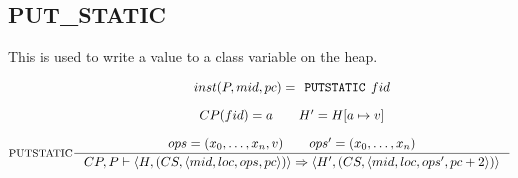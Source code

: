 \subsection{PUT\_STATIC}
This is used to write a value to a class variable on the heap.

$$\inference[PUTSTATIC]{
inst(P,mid, pc) = \texttt{PUTSTATIC } fid \semnl \\
CP(fid) = a\semsp
H' = H[a\mapsto v] \semnl \\
ops = (x_0, \ldots, x_n, v) \semsp 
ops' = (x_0, \ldots, x_{n})
}
{CP, P \vdash \langle H, (CS, \langle mid, loc, ops, pc \rangle )\rangle \Rightarrow \langle H', (CS, \langle mid, loc, ops', pc + 2 \rangle )\rangle}$$
